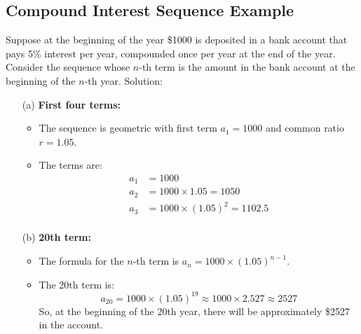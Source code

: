 \subsection{Compound Interest Sequence Example}
Suppose at the beginning of the year \$1000 is deposited in a bank account that pays 5\% interest per year, compounded once per year at the end of the year. Consider the sequence whose \(n\)-th term is the amount in the bank account at the beginning of the \(n\)-th year.
Solution:
\begin{enumerate}
    \item[(a)] \textbf{First four terms:}
    \begin{itemize}
        \item The sequence is geometric with first term \(a_1 = 1000\) and common ratio \(r = 1.05\).
        \item The terms are:
        \begin{align*}
            a_1 &= 1000 \\
            a_2 &= 1000 \times 1.05 = 1050 \\
            a_3 &= 1000 \times (1.05)^2 = 1102.5 \\
        \end{align*}
    \end{itemize}
    \item[(b)] \textbf{20th term:}
    \begin{itemize}
        \item The formula for the \(n\)-th term is \(a_n = 1000 \times (1.05)^{n-1}\).
        \item The 20th term is:
        \[ a_{20} = 1000 \times (1.05)^{19} \approx 1000 \times 2.527 \approx 2527 \]
        So, at the beginning of the 20th year, there will be approximately \$2527 in the account.
    \end{itemize}
\end{enumerate}

